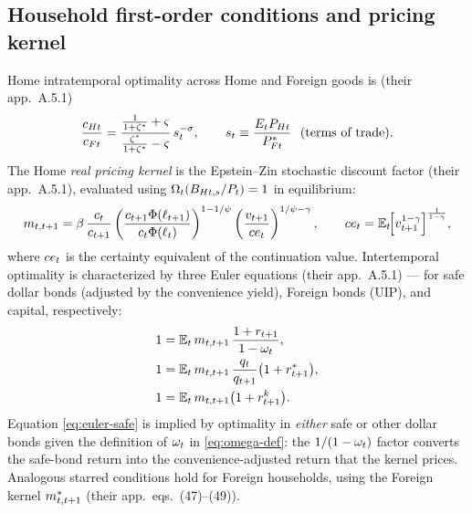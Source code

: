 \subsection{Household first-order conditions and pricing kernel}
\label{sec:hh-foc}

Home intratemporal optimality across Home and Foreign goods is (their app.\
A.5.1)
\begin{equation}
\label{eq:intratemporal}
\frac{c_{Ht}}{c_{Ft}}
=\frac{\tfrac{1}{1+\zeta^{*}}+\varsigma}{\tfrac{\zeta^{*}}{1+\zeta^{*}}-\varsigma}\,s_t^{-\sigma},
\qquad s_t\equiv\frac{E_t P_{Ht}}{P^{*}_{Ft}}\ \ \text{(terms of trade)}.
\end{equation}
The Home \emph{real pricing kernel} is the Epstein--Zin stochastic discount
factor (their app.\ A.5.1), evaluated using $\Omega_t(B_{Ht,s}/P_t)=1$ in
equilibrium:
\begin{equation}
\label{eq:kernel}
m_{t,t+1}=\beta\,\frac{c_t}{c_{t+1}}
\left(\frac{c_{t+1}\Phi(\ell_{t+1})}{c_t\Phi(\ell_t)}\right)^{1-1/\psi}
\left(\frac{v_{t+1}}{ce_t}\right)^{1/\psi-\gamma},
\qquad
ce_t=\mathbb{E}_t\!\Bigl[v_{t+1}^{1-\gamma}\Bigr]^{\frac1{1-\gamma}},
\end{equation}
where $ce_t$ is the certainty equivalent of the continuation value. Intertemporal
optimality is characterized by three Euler equations (their app.\ A.5.1) --- for
safe dollar bonds (adjusted by the convenience yield), Foreign bonds (UIP), and
capital, respectively:
\begin{align}
\label{eq:euler-safe}
1&=\mathbb{E}_t\,m_{t,t+1}\,\frac{1+r_{t+1}}{1-\omega_t},\\
\label{eq:euler-uip}
1&=\mathbb{E}_t\,m_{t,t+1}\,\frac{q_t}{q_{t+1}}\bigl(1+r^{*}_{t+1}\bigr),\\
\label{eq:euler-capital}
1&=\mathbb{E}_t\,m_{t,t+1}\bigl(1+r^{k}_{t+1}\bigr).
\end{align}
Equation \eqref{eq:euler-safe} is implied by optimality in \emph{either} safe or
other dollar bonds given the definition of $\omega_t$ in \eqref{eq:omega-def}: the
$1/(1-\omega_t)$ factor converts the safe-bond return into the convenience-adjusted
return that the kernel prices. Analogous starred conditions hold for Foreign
households, using the Foreign kernel $m^{*}_{t,t+1}$ (their app.\ eqs.\
(47)--(49)).

